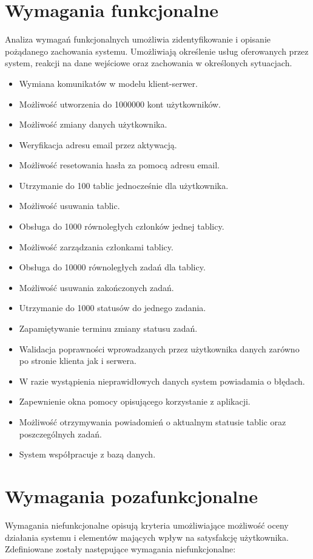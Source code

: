 \documentclass[12pt]{report}
\begin{document}
\section{Wymagania funkcjonalne}
Analiza wymagań funkcjonalnych umożliwia zidentyfikowanie i opisanie pożądanego zachowania systemu. 
Umożliwiają określenie usług oferowanych przez system, reakcji na dane wejściowe oraz zachowania w określonych sytuacjach.
\begin{itemize}
\item Wymiana komunikatów w modelu klient-serwer.
\item Możliwość utworzenia do 1000000 kont użytkowników.
\item Możliwość zmiany danych użytkownika.
\item Weryfikacja adresu email przez aktywacją.
\item Możliwość resetowania hasła za pomocą adresu email.
\item Utrzymanie do 100 tablic jednocześnie dla użytkownika.
\item Możliwość usuwania tablic.
\item Obsługa do 1000 równoległych członków jednej tablicy.
\item Możliwość zarządzania członkami tablicy.
\item Obsługa do 10000 równoległych zadań dla tablicy.
\item Możliwość usuwania zakończonych zadań.
\item Utrzymanie do 1000 statusów do jednego zadania.
\item Zapamiętywanie terminu zmiany statusu zadań.
\item Walidacja poprawności wprowadzanych przez użytkownika danych zarówno po stronie klienta jak i serwera.
\item W razie wystąpienia nieprawidłowych danych system powiadamia o błędach.
\item Zapewnienie okna pomocy opisującego korzystanie z aplikacji.
\item Możliwość otrzymywania powiadomień o aktualnym statusie tablic oraz poszczególnych zadań.
\item System współpracuje z bazą danych.
\end{itemize}

\section{Wymagania pozafunkcjonalne}
Wymagania niefunkcjonalne opisują kryteria umożliwiające możliwość oceny działania systemu i elementów mających wpływ na satysfakcję użytkownika.
Zdefiniowane zostały następujące wymagania niefunkcjonalne:
\end{document}
